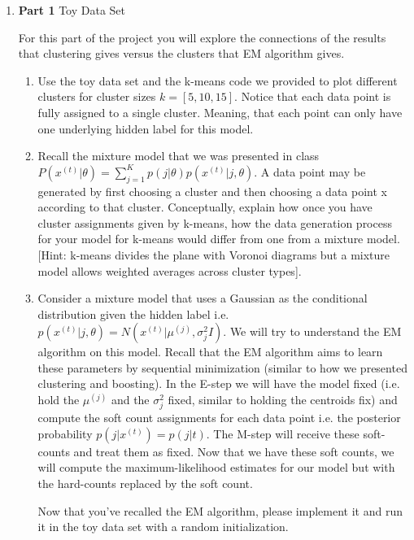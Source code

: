 \begin{enumerate}

\item {\bf Part 1} Toy Data Set

For this part of the project you will explore the connections of the results that clustering gives versus the clusters that EM algorithm gives.

\begin{enumerate}
  \item Use the toy data set and the k-means code we provided to plot different clusters for cluster sizes $k = [5, 10, 15]$. Notice that each data point is fully assigned to a single cluster. Meaning, that each point can only have one underlying hidden label for this model.
  \item Recall the mixture model that we was presented in class $P(x^{(t)} | \theta) = \sum^{K}_{j=1} p(j| \theta)p(x^{(t)} | j, \theta) $. A data point may be generated by first choosing a cluster and then choosing a data point x according to that cluster. Conceptually, explain how once you have cluster assignments given by k-means, how the data generation process for your model for k-means would differ from one from a mixture model. [Hint: k-means divides the plane with Voronoi diagrams but a mixture model allows weighted averages across cluster types].
  \item Consider a mixture model that uses a Gaussian as the conditional distribution given the hidden label i.e. $p(x^{(t)} | j, \theta) = N(x^{(t)}| \mu^{(j)}, \sigma^2_{j} I)$.  We will try to understand the EM algorithm on this model. 
 Recall that the EM algorithm aims to learn these parameters by sequential minimization (similar to how we presented clustering and boosting). 
In the E-step we will have the model fixed (i.e. hold the $ \mu^{(j)}$ and the $\sigma^2_{j}$ fixed, similar to holding the centroids fix) and compute the soft count assignments for each data point i.e. the posterior probability $p(j | x^{(t)}) = p(j|t)$. The M-step will receive these soft-counts and treat them as fixed. Now that we have these soft counts, we will compute the maximum-likelihood estimates for our model but with the hard-counts replaced by the soft count. 

Now that you've recalled the EM algorithm, please implement it and run it in the toy data set with a random initialization. 


\end{enumerate}
\end{enumerate}

